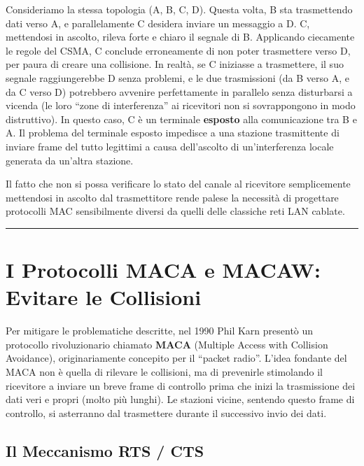 \documentclass[
  italian,
  openany]{book}
\begin{document}
Consideriamo la stessa topologia (A, B, C, D). Questa volta, B sta
trasmettendo dati verso A, e parallelamente C desidera inviare un
messaggio a D. C, mettendosi in ascolto, rileva forte e chiaro il
segnale di B. Applicando ciecamente le regole del CSMA, C conclude
erroneamente di non poter trasmettere verso D, per paura di creare una
collisione. In realtà, se C iniziasse a trasmettere, il suo segnale
raggiungerebbe D senza problemi, e le due trasmissioni (da B verso A, e
da C verso D) potrebbero avvenire perfettamente in parallelo senza
disturbarsi a vicenda (le loro ``zone di interferenza'' ai ricevitori
non si sovrappongono in modo distruttivo). In questo caso, C è un
terminale \textbf{esposto} alla comunicazione tra B e A. Il problema del
terminale esposto impedisce a una stazione trasmittente di inviare frame
del tutto legittimi a causa dell'ascolto di un'interferenza locale
generata da un'altra stazione.

Il fatto che non si possa verificare lo stato del canale al ricevitore
semplicemente mettendosi in ascolto dal trasmettitore rende palese la
necessità di progettare protocolli MAC sensibilmente diversi da quelli
delle classiche reti LAN cablate.

\begin{center}\rule{0.5\linewidth}{0.5pt}\end{center}

\section{I Protocolli MACA e MACAW: Evitare le
Collisioni}\label{i-protocolli-maca-e-macaw-evitare-le-collisioni}

Per mitigare le problematiche descritte, nel 1990 Phil Karn presentò un
protocollo rivoluzionario chiamato \textbf{MACA} (Multiple Access with
Collision Avoidance), originariamente concepito per il ``packet radio''.
L'idea fondante del MACA non è quella di rilevare le collisioni, ma di
prevenirle stimolando il ricevitore a inviare un breve frame di
controllo prima che inizi la trasmissione dei dati veri e propri (molto
più lunghi). Le stazioni vicine, sentendo questo frame di controllo, si
asterranno dal trasmettere durante il successivo invio dei dati.

\subsection{Il Meccanismo RTS / CTS}\label{il-meccanismo-rts-cts}
\end{document}
